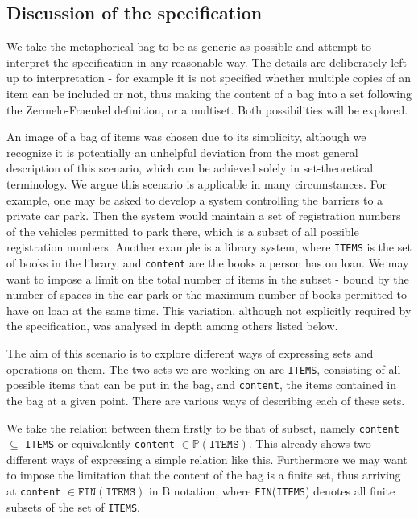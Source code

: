 \documentclass[12pt,journal,duplex]{IEEEtran}
\begin{document}
	\subsection{Discussion of the specification}
	We take the metaphorical bag to be as generic as possible and attempt to interpret the specification in any reasonable way. The details are deliberately left up to interpretation - for example it is not specified whether multiple copies of an item can be included or not, thus making the content of a bag into a set following the Zermelo-Fraenkel definition, or a multiset. Both possibilities will be explored.

	An image of a bag of items was chosen due to its simplicity, although we recognize it is potentially an unhelpful deviation from the most general description of this scenario, which can be achieved solely in set-theoretical terminology. We argue this scenario is applicable in many circumstances. For example, one may be asked to develop a system controlling the barriers to a private car park. Then the system would maintain a set of registration numbers of the vehicles permitted to park there, which is a subset of all possible registration numbers. Another example is a library system, where \texttt{ITEMS} is the set of books in the library, and \texttt{content} are the books a person has on loan. We may want to impose a limit on the total number of items in the subset - bound by the number of spaces in the car park or the maximum number of books permitted to have on loan at the same time. This variation, although not explicitly required by the specification, was analysed in depth among others listed below.

	The aim of this scenario is to explore different ways of expressing sets and operations on them. The two sets we are working on are \texttt{ITEMS}, consisting of all possible items that can be put in the bag, and \texttt{content}, the items contained in the bag at a given point. There are various ways of describing each of these sets.

	We take the relation between them firstly to be that of subset, namely \texttt{content} $\subseteq$ \texttt{ITEMS} or equivalently \texttt{content} $\in \mathbb{P}(\texttt{ITEMS})$. This already shows two different ways of expressing a simple relation like this. Furthermore we may want to impose the limitation that the content of the bag is a finite set, thus arriving at \texttt{content} $\in \texttt{FIN}(\texttt{ITEMS})$ in B notation, where \texttt{FIN}(\texttt{ITEMS}) denotes all finite subsets of the set of \texttt{ITEMS}.
\end{document}
